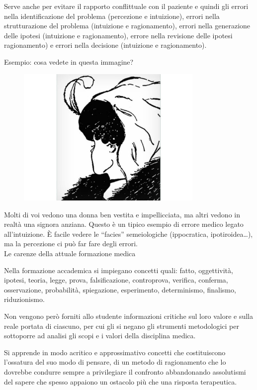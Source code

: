   Serve anche per evitare il rapporto conflittuale con il paziente e
  quindi gli errori nella identificazione del problema (percezione e
  intuizione), errori nella strutturazione del problema (intuizione e
  ragionamento), errori nella generazione delle ipotesi (intuizione e
  ragionamento), errore nella revisione delle ipotesi ragionamento) e
  errori nella decisione (intuizione e ragionamento).
  

  Esempio: cosa vedete in questa immagine?

   \begin{figure}[!ht]
\centering
	\includegraphics[width=0.8\textwidth]{33/image1.jpeg}
	\end{figure}
  
  Molti
  di voi vedono una donna ben vestita e impellicciata, ma altri vedono
  in realtà una signora anziana. Questo è un tipico esempio di errore
  medico legato all'intuizione. È facile vedere le ``facies''
  semeiologiche (ippocratica, ipotiroidea\ldots{}), ma la percezione ci
  può far fare degli errori.\\
  Le carenze della attuale formazione medica

  Nella formazione accademica si impiegano concetti quali: fatto,
  oggettività, ipotesi, teoria, legge, prova, falsificazione,
  controprova, verifica, conferma, osservazione, probabilità,
  spiegazione, esperimento, determinismo, finalismo, riduzionismo.

  Non vengono però forniti allo studente informazioni critiche sul loro
  valore e sulla reale portata di ciascuno, per cui gli si negano gli
  strumenti metodologici per sottoporre ad analisi gli scopi e i valori
  della disciplina medica.

  Si apprende in modo acritico e approssimativo concetti che
  costituiscono l'ossatura del suo modo di pensare, di un metodo di
  ragionamento che lo dovrebbe condurre sempre a privilegiare il
  confronto abbandonando assolutismi del sapere che spesso appaiono un
  ostacolo più che una risposta terapeutica.

